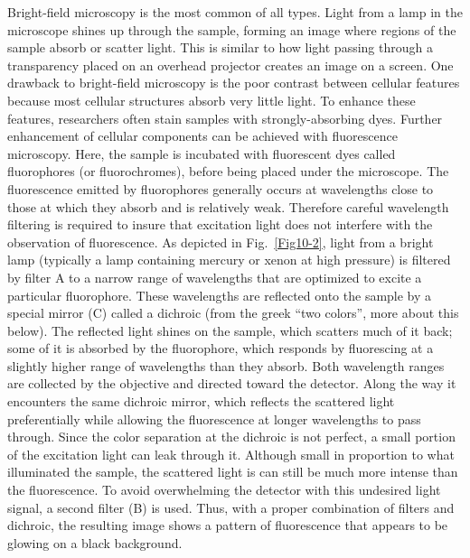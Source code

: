 Bright-field microscopy is the most common of all types.  Light from a lamp in the microscope shines up through the sample, forming an image where regions of the sample absorb or scatter light.  This is similar to how light passing through a transparency placed on an overhead projector creates an image on a screen.  One drawback to bright-field microscopy is the poor contrast between cellular features because most cellular structures absorb very little light. To enhance these features, researchers often stain samples with strongly-absorbing dyes.    
Further enhancement of cellular components can be achieved with fluorescence microscopy.  Here, the sample is incubated with fluorescent dyes called fluorophores (or fluorochromes), before being placed under the microscope.  The fluorescence emitted by fluorophores generally occurs at wavelengths close to those at which they absorb and is relatively weak. Therefore careful wavelength filtering is required to insure that excitation light does not interfere with the observation of fluorescence. As depicted in Fig.~\ref{Fig10-2}, light from a bright lamp (typically a lamp containing mercury or xenon at high pressure) is filtered by filter A to a narrow range of wavelengths that are optimized to excite a particular fluorophore. These wavelengths are reflected onto the sample by a special mirror (C) called a dichroic (from the greek ``two colors'', more about this below). The reflected light shines on the sample, which scatters much of it back; some of it is absorbed by the fluorophore, which responds by fluorescing at a slightly higher range of wavelengths than they absorb.  Both wavelength ranges are collected by the objective and directed toward the detector. Along the way it encounters the same dichroic mirror, which reflects the scattered light preferentially while allowing the fluorescence at longer wavelengths to pass through. Since the color separation at the dichroic is not perfect, a small portion of the excitation light can leak through it. Although small in proportion to what illuminated the sample, the scattered light is can still be much more intense than the fluorescence. To avoid overwhelming the detector with this undesired light signal, a second filter (B) is used. Thus, with a proper combination of filters and dichroic, the resulting image shows a pattern of fluorescence that appears to be glowing on a black background.  
